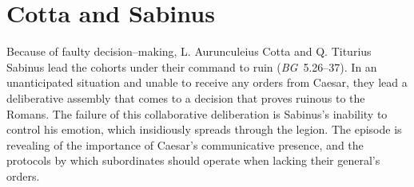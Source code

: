 \documentclass[12pt,letterpaper,oneside,final]{memoir}
\begin{document}
\section{Cotta and Sabinus}
\label{cotta-sabinus}
Because of faulty decision--making, L. Aurunculeius Cotta and Q. Titurius Sabinus lead the cohorts under their command to ruin (\emph{BG}~5.26--37). In an unanticipated situation and unable to receive any orders from Caesar, they lead a deliberative assembly that comes to a decision that proves ruinous to the Romans. The failure of this collaborative deliberation is Sabinus's inability to control his emotion, which insidiously spreads through the legion. The episode is revealing of the importance of Caesar's communicative presence, and the protocols by which subordinates should operate when lacking their general's orders. 
\end{document}
